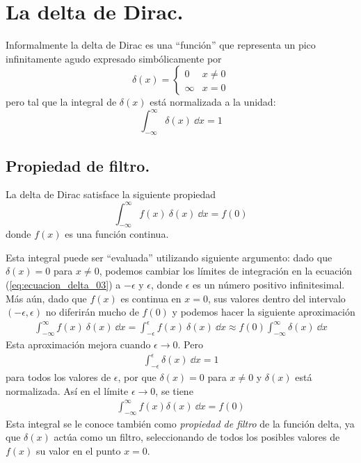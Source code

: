 \section{La delta de Dirac.}
Informalmente la delta de Dirac es una \enquote{función} que representa un pico infinitamente agudo expresado simbólicamente por
\begin{equation}
\delta (x) = \begin{cases}
0 & x \neq 0 \\
\infty & x = 0
\end{cases}
\label{eq:ecuacion_delta_01}
\end{equation}
pero tal que la integral de $\delta (x)$ está normalizada a la unidad:
\begin{equation}
\int_{-\infty}^{\infty} \delta (x) \: \dd{x} = 1 
\label{eq:ecuacion_delta_02}
\end{equation}
\subsection{Propiedad de filtro.}
La delta de Dirac satisface la siguiente propiedad
\begin{equation}
\int_{-\infty}^{\infty} f(x) \: \delta (x) \: \dd{x} = f(0)
\label{eq:ecuacion_delta_03}
\end{equation}
donde $f(x)$ es una función continua.
\par
Esta integral puede ser \enquote{evaluada} utilizando siguiente argumento: dado que $\delta (x) = 0$
para $x \neq 0$, podemos cambiar los límites de integración en la ecuación (\ref{eq:ecuacion_delta_03}) a $- \epsilon$ y $\epsilon$, donde $\epsilon$ es un número positivo infinitesimal. Más aún, dado que $f(x)$ es continua en $x = 0$, sus valores dentro del intervalo $( - \epsilon, \epsilon)$ no diferirán mucho de $f(0)$ y podemos hacer la siguiente aproximación
\begin{align*}
\int_{-\infty}^{\infty} f(x) \: \delta (x) \: \dd{x} = \int_{-\epsilon}^{\epsilon} f(x) \: \delta (x) \: \dd{x} \approx f(0) \int_{-\infty}^{\infty} \delta (x) \: \dd{x}
\end{align*}
Esta aproximación mejora cuando $\epsilon \to 0$. Pero
\begin{align*}
\int_{-\epsilon}^{\epsilon} \delta (x) \: \dd{x} = 1
\end{align*}
para todos los valores de $\epsilon$, por que $\delta (x) = 0$ para $x \neq 0$ y $\delta (x)$ está normalizada. Así en el límite $\epsilon \to 0$, se tiene
\begin{align*}
\int_{-\infty}^{\infty} f(x) \delta (x) \: \dd{x} = f(0)
\end{align*}
Esta integral se le conoce también como \emph{propiedad de filtro} de la función delta, ya que $\delta (x)$ actúa como un filtro, seleccionando de todos los posibles valores de $f(x)$ su valor en el punto $x=0$.
